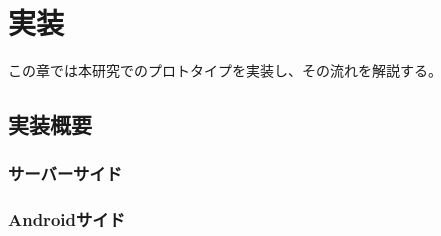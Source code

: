 \chapter{実装}
\label{chap:prototype}

この章では本研究でのプロトタイプを実装し、その流れを解説する。

\section{実装概要}

\subsection{サーバーサイド}

\subsection{Androidサイド}
